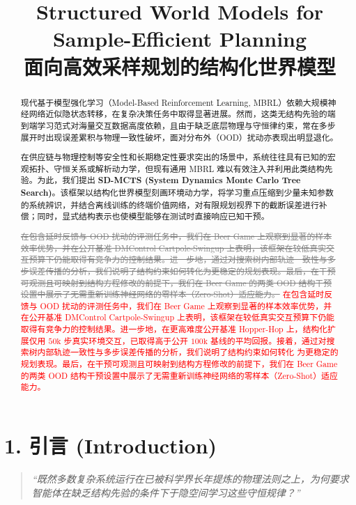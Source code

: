 \documentclass[UTF8]{ctexart}
\title{Structured World Models for Sample-Efficient Planning\\[0.4em]
\large 面向高效采样规划的结构化世界模型}
\author{}
\date{}
\newcommand{\revadd}[1]{\textcolor{red}{#1}}
\newcommand{\revdel}[1]{\textcolor{gray}{\sout{#1}}}
\begin{document}
\maketitle
\begin{abstract}

现代基于模型强化学习（Model-Based Reinforcement Learning, MBRL）依赖大规模神经网络近似隐状态转移，在复杂决策任务中取得显著进展。然而，这类无结构先验的端到端学习范式对海量交互数据高度依赖，且由于缺乏底层物理与守恒律约束，常在多步展开时出现误差累积与物理一致性破坏，面对分布外（OOD）扰动亦表现出明显退化。

在供应链与物理控制等安全性和长期稳定性要求突出的场景中，系统往往具有已知的宏观拓扑、守恒关系或解析动力学，但现有通用 MBRL 难以有效注入并利用此类结构先验。为此，我们提出 \textbf{SD-MCTS (System Dynamics Monte Carlo Tree Search)}。该框架以结构化世界模型刻画环境动力学，将学习重点压缩到少量未知参数的系统辨识，并结合离线训练的终端价值网络，对有限规划视界下的截断误差进行补偿；同时，显式结构表示也使模型能够在测试时直接响应已知干预。

\revdel{在包含延时反馈与 OOD 扰动的评测任务中，我们在 Beer Game 上观察到显著的样本效率优势，并在公开基准 DMControl Cartpole-Swingup 上表明，该框架在较低真实交互预算下仍能取得有竞争力的控制结果。进一步地，通过对搜索树内部轨迹一致性与多步误差传播的分析，我们说明了结构约束如何转化为更稳定的规划表现。最后，在干预可观测且可映射到结构方程修改的前提下，我们在 Beer Game 的两类 OOD 结构干预设置中展示了无需重新训练神经网络的零样本（Zero-Shot）适应能力。}
\revadd{在包含延时反馈与 OOD 扰动的评测任务中，我们在 Beer Game 上观察到显著的样本效率优势，并在公开基准 DMControl Cartpole-Swingup 上表明，该框架在较低真实交互预算下仍能取得有竞争力的控制结果。进一步地，在更高难度公开基准 Hopper-Hop 上，结构化扩展仅用 \(50\text{k}\) 步真实环境交互，已取得高于公开 \(100\text{k}\) 基线的平均回报。接着，通过对搜索树内部轨迹一致性与多步误差传播的分析，我们说明了结构约束如何转化
为更稳定的规划表现。最后，在干预可观测且可映射到结构方程修改的前提下，我们在 Beer Game 的两类 OOD 结构干预设置中展示了无需重新训练神经网络的零样本（Zero-Shot）适应能力。}
\end{abstract}

\hypertarget{sec-introduction}{%
\section{1. 引言 (Introduction)}\label{sec-introduction}}

\begin{quote}
\emph{``既然多数复杂系统运行在已被科学界长年提炼的物理法则之上，为何要求智能体在缺乏结构先验的条件下于隐空间学习这些守恒规律？''}
\end{quote}
\end{document}
